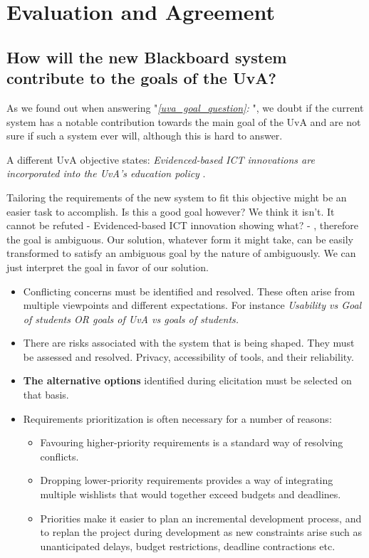 \chapter{Evaluation and Agreement}
\section{How will the new Blackboard system contribute to the goals of the UvA?}
As we found out when answering "\emph{\ref{uva_goal_question}: }", we doubt if the current system has a notable contribution towards the main goal of the UvA and are not sure if such a system ever will, although this is hard to answer.

A different UvA objective states: \emph{Evidenced-based ICT innovations are	incorporated into the UvA’s education policy} \cite{uva_strategic_plan}.

Tailoring the requirements of the new system to fit this objective might be an easier task to accomplish. Is this a good goal however? We think it isn't. It cannot be refuted - Evidenced-based ICT innovation showing what? - , therefore the goal is ambiguous. Our solution, whatever form it might take, can be easily transformed to satisfy an ambiguous goal by the nature of ambiguously. We can just interpret the goal in favor of our solution. 

\begin{itemize}
	\item Conflicting concerns must be identified and resolved. These often arise from multiple
	viewpoints and different expectations. For instance \textit{Usability vs Goal of students OR goals of UvA vs goals of students.}
	\item There are risks associated with the system that is being shaped. They must be assessed
	and resolved. {Privacy, accessibility of tools, and their reliability.}
	\item \textbf{The alternative options} identified during elicitation must be selected on that basis. 
	\item Requirements prioritization is often necessary for a number of reasons: 
	\begin{itemize}
		\item Favouring higher-priority requirements is a standard way of resolving conflicts.
		\item Dropping lower-priority requirements provides a way of integrating multiple wishlists
		that would together exceed budgets and deadlines.
		\item Priorities make it easier to plan an incremental development process, and to replan
		the project during development as new constraints arise such as unanticipated delays,
		budget restrictions, deadline contractions etc.
	\end{itemize}
\end{itemize}

